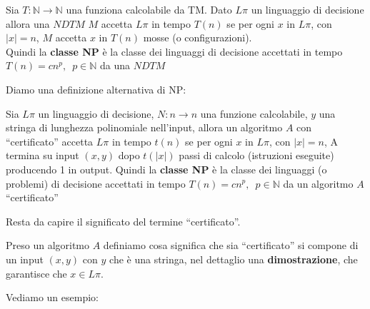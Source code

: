 \begin{definizione}
	Sia $T:\mathbb{N}\to\mathbb{N}$ una funziona calcolabile da TM. Dato $L\pi$ un
	linguaggio di decisione allora una $NDTM$ $M$ accetta $L\pi$ in tempo
	$T(n)$ se per ogni $x$ in $L\pi$, con $|x|=n$,  $M$ accetta $x$ in $T(n)$
	mosse (o configurazioni).\\
	Quindi la \textbf{classe NP} è la classe dei linguaggi di decisione accettati
	in tempo $T(n)=cn^p,\,\,\,p\in \mathbb{N}$ da una $NDTM$
\end{definizione}
Diamo una definizione alternativa di NP:
\begin{definizione}
	Sia $L\pi$ un linguaggio di decisione, $N:n\to n$ una funzione calcolabile,
	$y$ una stringa di lunghezza polinomiale nell'input, allora un algoritmo $A$
	con ``certificato'' accetta $L\pi$ in tempo $t(n)$ se per ogni $x$ in $L\pi$,
	con $|x|=n$, A termina su input $(x,y)$ dopo $t(|x|)$ passi di calcolo
	(istruzioni eseguite) producendo 1 in output.
	Quindi la \textbf{classe NP} è la classe dei linguaggi (o problemi) di
	decisione accettati in tempo $T(n)=cn^p,\,\,\,p\in\mathbb{N}$ da un algoritmo
	$A$ ``certificato''
\end{definizione}
Resta da capire il significato del termine ``certificato''.
\begin{definizione}
	Preso un algoritmo $A$ definiamo cosa significa che sia ``certificato'' si
	compone di un input $(x,y)$ con $y$ che è una stringa, nel dettaglio una
	\textbf{dimostrazione}, che garantisce che $x\in L\pi$.
\end{definizione}
Vediamo un esempio:
